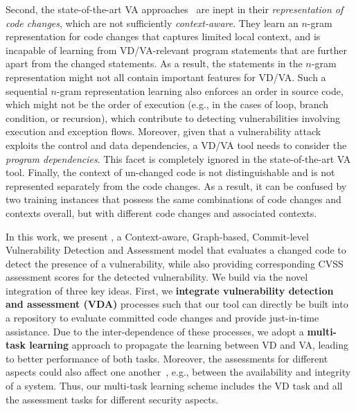 Second, the state-of-the-art VA approaches~\cite{deepCVA-ase21} are
inept in their {\em representation of code changes}, 
which are not sufficiently {\em context-aware}.
They learn an $n$-gram
representation for code changes that captures limited local context,
and is incapable of learning from VD/VA-relevant program statements that
are further apart from the changed statements.
As a result, the statements
in the $n$-gram representation might not all contain important features for
VD/VA. Such a sequential $n$-gram representation learning also enforces an order in source code, which might not
be the order of execution (e.g., in the cases of loop,  branch condition, or
recursion), which contribute to detecting vulnerabilities involving
execution and exception flows. Moreover, given that a vulnerability attack exploits the
control and data dependencies, a VD/VA tool needs to consider the {\em program dependencies}.
This facet is completely ignored in the state-of-the-art VA tool.
Finally, the context of
un-changed code is not distinguishable and is not represented separately
from the code changes. As a result, it can be confused by two training
instances that possess the same combinations of code changes and contexts overall,
but with different code changes and associated contexts.

In this work, we present {\tool}, a Context-aware, Graph-based,
Commit-level Vulnerability Detection and Assessment model that evaluates
a changed code to detect the presence of a vulnerability, while also providing corresponding CVSS
assessment scores for the detected vulnerability. 
We build {\tool} via the novel integration of three key ideas. 
First, we {\bf integrate vulnerability detection and assessment (VDA)} processes
such that our tool can directly be built into a repository to evaluate committed code
changes and provide just-in-time assistance. Due to the inter-dependence of these
processes, we adopt a {\bf multi-task learning} approach to propagate the learning between VD and
VA, leading to better performance of both tasks. Moreover, the
assessments for different aspects could also affect one
another~\cite{deepCVA-ase21}, e.g., between the availability and
integrity of a system. Thus, our multi-task learning scheme includes
the VD task and all the assessment tasks for different security
aspects.

